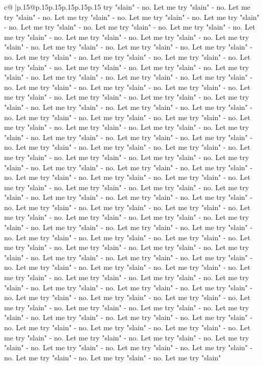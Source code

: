 \documentclass{article}
\begin{document}
{\begin{supertabular}{c@{$\;$}|p{.15\linewidth}@{}p{.15\linewidth}p{.15\linewidth}p{.15\linewidth}p{.15\linewidth}p{.15\linewidth}}
{{{try "slain" {-} no. Let me try "slain" {-} no. Let me try "slain" {-} no. Let me try "slain" {-} no. Let me try "slain" {-} no. Let me try "slain" {-} no. Let me try "slain" {-} no. Let me try "slain" {-} no. Let me try "slain" {-} no. Let me try "slain" {-} no. Let me try "slain" {-} no. Let me try "slain" {-} no. Let me try "slain" {-} no. Let me try "slain" {-} no. Let me try "slain" {-} no. Let me try "slain" {-} no. Let me try "slain" {-} no. Let me try "slain" {-} no. Let me try "slain" {-} no. Let me try "slain" {-} no. Let me try "slain" {-} no. Let me try "slain" {-} no. Let me try "slain" {-} no. Let me try "slain" {-} no. Let me try "slain" {-} no. Let me try "slain" {-} no. Let me try "slain" {-} no. Let me try "slain" {-} no. Let me try "slain" {-} no. Let me try "slain" {-} no. Let me try "slain" {-} no. Let me try "slain" {-} no. Let me try "slain" {-} no. Let me try "slain" {-} no. Let me try "slain" {-} no. Let me try "slain" {-} no. Let me try "slain" {-} no. Let me try "slain" {-} no. Let me try "slain" {-} no. Let me try "slain" {-} no. Let me try "slain" {-} no. Let me try "slain" {-} no. Let me try "slain" {-} no. Let me try "slain" {-} no. Let me try "slain" {-} no. Let me try "slain" {-} no. Let me try "slain" {-} no. Let me try "slain" {-} no. Let me try "slain" {-} no. Let me try "slain" {-} no. Let me try "slain" {-} no. Let me try "slain" {-} no. Let me try "slain" {-} no. Let me try "slain" {-} no. Let me try "slain" {-} no. Let me try "slain" {-} no. Let me try "slain" {-} no. Let me try "slain" {-} no. Let me try "slain" {-} no. Let me try "slain" {-} no. Let me try "slain" {-} no. Let me try "slain" {-} no. Let me try "slain" {-} no. Let me try "slain" {-} no. Let me try "slain" {-} no. Let me try "slain" {-} no. Let me try "slain" {-} no. Let me try "slain" {-} no. Let me try "slain" {-} no. Let me try "slain" {-} no. Let me try "slain" {-} no. Let me try "slain" {-} no. Let me try "slain" {-} no. Let me try "slain" {-} no. Let me try "slain" {-} no. Let me try "slain" {-} no. Let me try "slain" {-} no. Let me try "slain" {-} no. Let me try "slain" {-} no. Let me try "slain" {-} no. Let me try "slain" {-} no. Let me try "slain" {-} no. Let me try "slain" {-} no. Let me try "slain" {-} no. Let me try "slain" {-} no. Let me try "slain" {-} no. Let me try "slain" {-} no. Let me try "slain" {-} no. Let me try "slain" {-} no. Let me try "slain" {-} no. Let me try "slain" {-} no. Let me try "slain" {-} no. Let me try "slain" {-} no. Let me try "slain" {-} no. Let me try "slain" {-} no. Let me try "slain" {-} no. Let me try "slain" {-} no. Let me try "slain" {-} no. Let me try "slain" {-} no. Let me try "slain" {-} no. Let me try "slain" {-} no. Let me try "slain" {-} no. Let me try "slain" {-} no. Let me try "slain" {-} no. Let me try "slain" {-} no. Let me try "slain" {-} no. Let me try "slain" {-} no. Let me try "slain" {-} no. Let me try "slain" {-} no. Let me try "slain" {-} no. Let me try "slain" {-} no. Let me try "slain" {-} no. Let me try "slain" {-} no. Let me try "slain" {-} no. Let me try "slain" {-} no. Let me try "slain" {-} no. Let me try "slain" {-} no. Let me try "slain" {-} no. Let me try "slain" }}}
\end{supertabular}}
\end{document}
